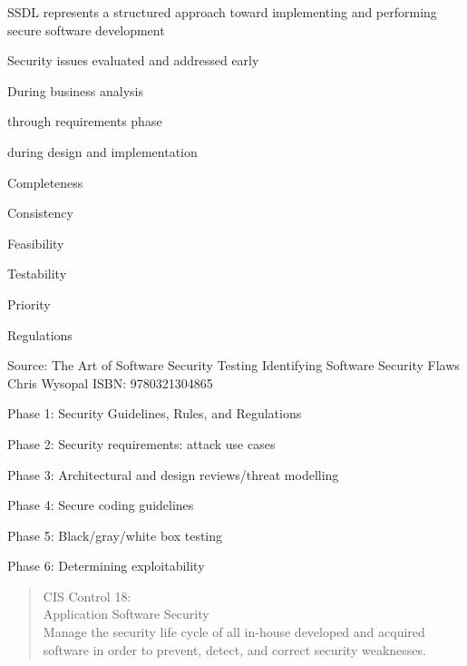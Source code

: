 \documentclass[Screen16to9,17pt]{foils}
\begin{document}

\begin{list2}
\item SSDL represents a structured approach toward implementing and performing secure software development
\item Security issues evaluated and addressed early
\item During business analysis
\item through requirements phase
\item during design and implementation
\end{list2}


\begin{list2}
\item Completeness
\item Consistency
\item Feasibility
\item Testability
\item Priority
\item Regulations
\end{list2}

Source: The Art of Software Security Testing Identifying Software Security Flaws
Chris Wysopal ISBN: 9780321304865


\begin{list2}
\item Phase 1: Security Guidelines, Rules, and Regulations
\item Phase 2: Security requirements: attack use cases
\item Phase 3: Architectural and design reviews/threat modelling
\item Phase 4: Secure coding guidelines
\item Phase 5: Black/gray/white box testing
\item Phase 6: Determining exploitability
\end{list2}



\begin{quote}
CIS Control 18:\\
Application Software Security\\
Manage the security life cycle of all in-house developed and acquired software in order to prevent, detect, and correct security weaknesses.
\end{quote}
\end{document}
